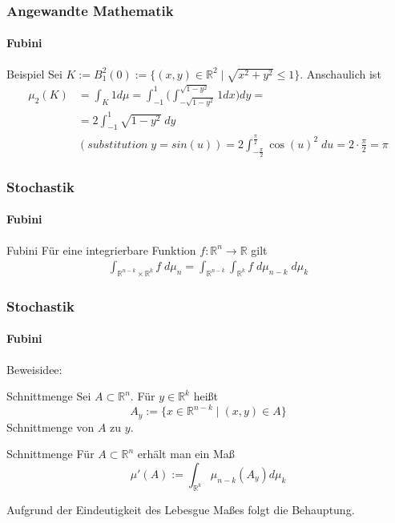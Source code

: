 \documentclass{beamer}
\begin{document}
 \begin{frame}
    \frametitle{Angewandte Mathematik}
    \framesubtitle{Fubini}
    \begin{block}{Beispiel}
Sei $K := B^2_1(0) := \{   (x,y) \in \mathbb{R}^2 \; | \; \sqrt{x^2 + y^2 } \leq 1\}$. Anschaulich ist
\begin{align*}
\mu_2(K) &  = \int_K 1 d \mu =  \int_{-1}^{1} \biggl ( \int_{-\sqrt{1- y^2}}^{\sqrt{1- y^2}} 1 dx \biggr ) dy = \\ 
& =  2 \int_{-1}^{1}  \sqrt{1 - y^2}   \; dy  \\ 
 & (substitution \;   y = sin(u)) =   2 \int_{-\frac{\pi}{2}}^{\frac{\pi}{2}}   \cos(u)^2   \; du = 2 \cdot \frac{\pi}{2} = \pi
\end{align*}
\end{block}
 \end{frame}
 
 \begin{frame}
    \frametitle{Stochastik}
\framesubtitle{Fubini}
    \begin{block}{Fubini}
        Für eine integrierbare Funktion $f: \mathbb{R}^n \to \mathbb{R}$ gilt
        \begin{align*}
        \int_{\mathbb{R}^{n-k} \times \mathbb{R}^{k}} f \; d\mu_n  =  \int_{\mathbb{R}^{n-k}}  \int_{\mathbb{R}^k}  f \; d\mu_{n-k} \;  d\mu_k  
        \end{align*}
    \end{block}

\end{frame}

\begin{frame}
    \frametitle{Stochastik}
\framesubtitle{Fubini}
Beweisidee:

\begin{block}{Schnittmenge}
Sei $ A \subset \mathbb{R}^n$. Für $ y \in \mathbb{R}^k$ heißt
$$ A_y :=  \biggl \{    x \in \mathbb{R}^{n-k}  \; | \;  (x,y) \in A \biggr \}$$  
Schnittmenge von $A$ zu $y$.
\end{block}

\begin{block}{Schnittmenge}
    Für $A \subset \mathbb{R}^n $ erhält man ein Maß
    $$ \mu'(A) := \int_{\mathbb{R}^k} \mu_{n-k}(A_y) d \mu_k$$ 
\end{block}
Aufgrund der Eindeutigkeit des Lebesgue Maßes folgt die Behauptung.
\end{frame}
\end{document}
